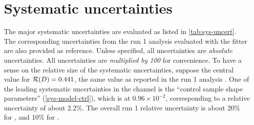 \chapter{Systematic uncertainties}
\label{ref:sys-uncert}

The major systematic uncertainties are evaluated as listed in
\cref{tab:sys-uncert}.
The corresponding uncertainties from the run 1 analysis evaluated with
the \HistFactory fitter are also provided as reference.
Unless specified, all uncertainties are \emph{absolute} uncertainties.
All uncertainties are \emph{multiplied by 100} for convenience.
To have a sense on the relative size of the systematic uncertainties,
suppose the central value for $\mathcal{R}(D) = 0.441$,
the same value as reported in the run 1 analysis \cite{RD_RDst_run1_2023}.
One of the leading systematic uncertainties in the \Dz channel is the
``control sample shape parameters'' (\cref{sys-model-ctrl}),
which is at $0.96 \times 10^{-2}$,
corresponding to a relative uncertainty of about 2.2\%.
The overall run 1 relative uncertainty is about 20\% for \RD,
and 10\% for \RDst.



